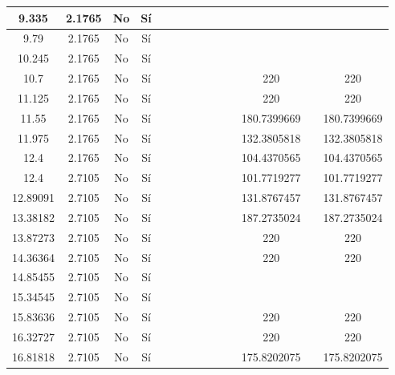 \begin{table}[H]
{\begin{tabular}{|c|c|c|c|c|c|c|c|c|c|c|c|c|c|}
\hline
9.335 & 2.1765 & No  & Sí  &     &     &     &     &     &     &     &     &     &  \bigstrut\\
\hline
9.79 & 2.1765 & No  & Sí  &     &     &     &     &     &     &     &     &     &  \bigstrut\\
\hline
10.245 & 2.1765 & No  & Sí  &     &     &     &     &     &     &     &     &     &  \bigstrut\\
\hline
10.7 & 2.1765 & No  & Sí  &     &     &     &     &     &     &     & 220 &     & 220 \bigstrut\\
\hline
11.125 & 2.1765 & No  & Sí  &     &     &     &     &     &     &     & 220 &     & 220 \bigstrut\\
\hline
11.55 & 2.1765 & No  & Sí  &     &     &     &     &     &     &     & 180.7399669 &     & 180.7399669 \bigstrut\\
\hline
11.975 & 2.1765 & No  & Sí  &     &     &     &     &     &     &     & 132.3805818 &     & 132.3805818 \bigstrut\\
\hline
12.4 & 2.1765 & No  & Sí  &     &     &     &     &     &     &     & 104.4370565 &     & 104.4370565 \bigstrut\\
\hline
12.4 & 2.7105 & No  & Sí  &     &     &     &     &     &     &     & 101.7719277 &     & 101.7719277 \bigstrut\\
\hline
12.89091 & 2.7105 & No  & Sí  &     &     &     &     &     &     &     & 131.8767457 &     & 131.8767457 \bigstrut\\
\hline
13.38182 & 2.7105 & No  & Sí  &     &     &     &     &     &     &     & 187.2735024 &     & 187.2735024 \bigstrut\\
\hline
13.87273 & 2.7105 & No  & Sí  &     &     &     &     &     &     &     & 220 &     & 220 \bigstrut\\
\hline
14.36364 & 2.7105 & No  & Sí  &     &     &     &     &     &     &     & 220 &     & 220 \bigstrut\\
\hline
14.85455 & 2.7105 & No  & Sí  &     &     &     &     &     &     &     &     &     &  \bigstrut\\
\hline
15.34545 & 2.7105 & No  & Sí  &     &     &     &     &     &     &     &     &     &  \bigstrut\\
\hline
15.83636 & 2.7105 & No  & Sí  &     &     &     &     &     &     &     & 220 &     & 220 \bigstrut\\
\hline
16.32727 & 2.7105 & No  & Sí  &     &     &     &     &     &     &     & 220 &     & 220 \bigstrut\\
\hline
16.81818 & 2.7105 & No  & Sí  &     &     &     &     &     &     &     & 175.8202075 &     & 175.8202075 \bigstrut\\

\end{tabular}}
\end{table}
